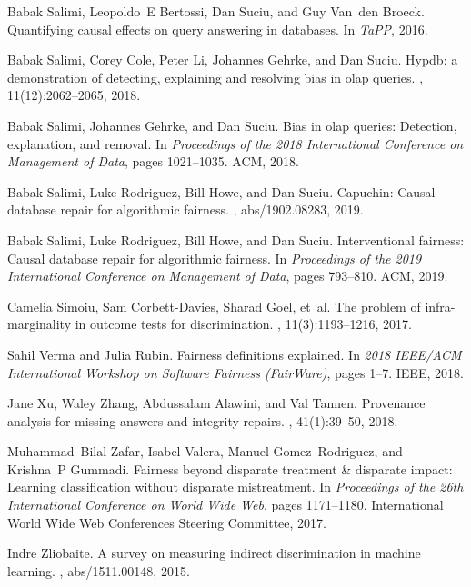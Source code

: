 Babak Salimi, Leopoldo~E Bertossi, Dan Suciu, and Guy Van~den Broeck.
\newblock Quantifying causal effects on query answering in databases.
\newblock In {\em TaPP}, 2016.

Babak Salimi, Corey Cole, Peter Li, Johannes Gehrke, and Dan Suciu.
\newblock Hypdb: a demonstration of detecting, explaining and resolving bias in
  olap queries.
, 11(12):2062--2065, 2018.

Babak Salimi, Johannes Gehrke, and Dan Suciu.
\newblock Bias in olap queries: Detection, explanation, and removal.
\newblock In {\em Proceedings of the 2018 International Conference on
  Management of Data}, pages 1021--1035. ACM, 2018.

Babak Salimi, Luke Rodriguez, Bill Howe, and Dan Suciu.
\newblock Capuchin: Causal database repair for algorithmic fairness.
, abs/1902.08283, 2019.

Babak Salimi, Luke Rodriguez, Bill Howe, and Dan Suciu.
\newblock Interventional fairness: Causal database repair for algorithmic
  fairness.
\newblock In {\em Proceedings of the 2019 International Conference on
  Management of Data}, pages 793--810. ACM, 2019.

Camelia Simoiu, Sam Corbett-Davies, Sharad Goel, et~al.
\newblock The problem of infra-marginality in outcome tests for discrimination.
, 11(3):1193--1216, 2017.

Sahil Verma and Julia Rubin.
\newblock Fairness definitions explained.
\newblock In {\em 2018 IEEE/ACM International Workshop on Software Fairness
  (FairWare)}, pages 1--7. IEEE, 2018.

Jane Xu, Waley Zhang, Abdussalam Alawini, and Val Tannen.
\newblock Provenance analysis for missing answers and integrity repairs.
, 41(1):39--50, 2018.

Muhammad~Bilal Zafar, Isabel Valera, Manuel Gomez~Rodriguez, and Krishna~P
  Gummadi.
\newblock Fairness beyond disparate treatment \& disparate impact: Learning
  classification without disparate mistreatment.
\newblock In {\em Proceedings of the 26th International Conference on World
  Wide Web}, pages 1171--1180. International World Wide Web Conferences
  Steering Committee, 2017.

Indre Zliobaite.
\newblock A survey on measuring indirect discrimination in machine learning.
, abs/1511.00148, 2015.

